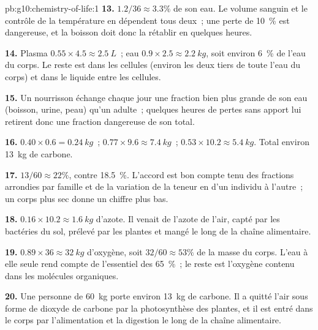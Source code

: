 \begin{solution}{pb:g10:chemistry-of-life:1}
\textbf{13.} $1.2/36 \approx 3.3\%$ de son eau. Le volume sanguin et
le contrôle de la température en dépendent tous deux~; une perte de
10~\% est dangereuse, et la boisson doit donc la rétablir en quelques
heures.

\textbf{14.} Plasma $0.55 \times 4.5 \approx \qty{2.5}{L}$~; eau $0.9
\times 2.5 \approx \qty{2.2}{kg}$, soit environ 6~\% de l'eau du corps.
Le reste est dans les cellules (environ les deux tiers de toute l'eau
du corps) et dans le liquide entre les cellules.

\textbf{15.} Un nourrisson échange chaque jour une fraction bien plus
grande de son eau (boisson, urine, peau) qu'un adulte~; quelques
heures de pertes sans apport lui retirent donc une fraction dangereuse
de son total.

\textbf{16.}  $0.40 \times 0.6 = \qty{0.24}{kg}$~; 
$0.77 \times 9.6 \approx \qty{7.4}{kg}$~;  $0.53 \times 10.2
\approx \qty{5.4}{kg}$. Total environ \qty{13}{kg} de carbone.

\textbf{17.} $13/60 \approx 22\%$, contre 18.5~\%. L'accord est bon
compte tenu des fractions arrondies par famille et de la variation de
la teneur en  d'un individu à l'autre~; un corps plus sec donne
un chiffre plus bas.

\textbf{18.} $0.16 \times 10.2 \approx \qty{1.6}{kg}$ d'azote. Il
venait de l'azote de l'air, capté par les bactéries du sol, prélevé
par les plantes et mangé le long de la chaîne alimentaire.

\textbf{19.} $0.89 \times 36 \approx \qty{32}{kg}$ d'oxygène, soit
$32/60 \approx 53\%$ de la masse du corps. L'eau à elle seule rend
compte de l'essentiel des 65~\%~; le reste est l'oxygène contenu dans
les molécules organiques.

\textbf{20.} Une personne de \qty{60}{kg} porte environ \qty{13}{kg}
de carbone. Il a quitté l'air sous forme de dioxyde de carbone par la
photosynthèse des plantes, et il est entré dans le corps par
l'alimentation et la digestion le long de la chaîne alimentaire.
\end{solution}
